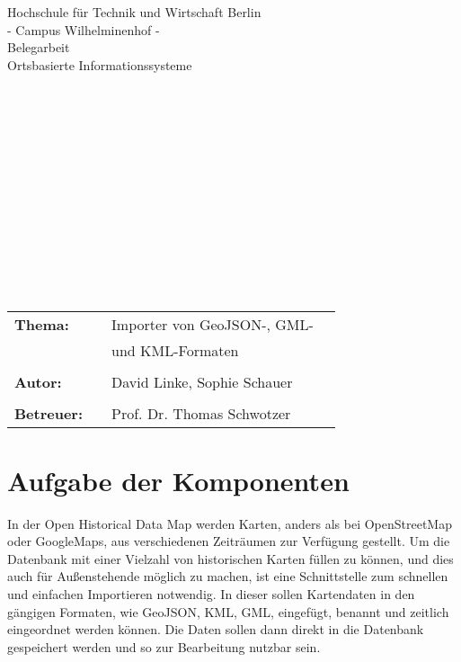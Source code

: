 \documentclass[]{article}
\begin{document}
\begin{center}
\Large{Hochschule für Technik und Wirtschaft Berlin}\\
\Large{- Campus Wilhelminenhof -}\\
\Large{Belegarbeit}\\
\Large{Ortsbasierte Informationssysteme}\\
\begin{verbatim}















\end{verbatim}
\begin{tabular}{llll}
\textbf{Thema: } & & Importer von GeoJSON-, GML- \\
&& und KML-Formaten \\
&& &\\
\textbf{Autor:} & & David Linke, Sophie Schauer \\
&& &\\
\textbf{Betreuer:} & & Prof. Dr. Thomas Schwotzer &\\
\end{tabular}
\end{center}
\pagebreak
\section{Aufgabe der Komponenten}
In der Open Historical Data Map werden Karten, anders als bei OpenStreetMap oder GoogleMaps, aus verschiedenen Zeiträumen zur Verfügung gestellt. Um die Datenbank mit einer Vielzahl von historischen Karten füllen zu können, und dies auch für Außenstehende möglich zu machen, ist eine Schnittstelle zum schnellen und einfachen Importieren notwendig. In dieser sollen Kartendaten in den gängigen Formaten, wie GeoJSON, KML, GML, eingefügt, benannt und zeitlich eingeordnet werden können. Die Daten sollen dann direkt in die Datenbank gespeichert werden und so zur Bearbeitung nutzbar sein.\\
\\
\end{document}
